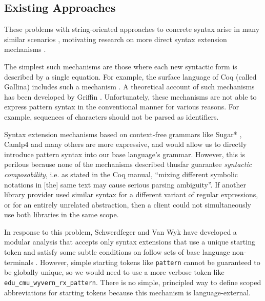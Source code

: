 \subsection{Existing Approaches}\label{sec:syntax-existing} These problems with string-oriented approaches to concrete syntax arise in many similar scenarios \cite{TSLs}, motivating  research on more direct syntax extension mechanisms \cite{Bravenboer:2007:PIA:1289971.1289975}.

The simplest such mechanisms are those where each new syntactic form is described by a single equation. For example, the surface language of Coq (called Gallina) includes such a mechanism \cite{Coq:manual}. A theoretical account of such mechanisms has been developed by Griffin \cite{5134}. Unfortunately, these mechanisms are not able to express pattern syntax in the conventional manner for various reasons. For example, sequences of characters should not be parsed as identifiers.


Syntax extension mechanisms based on context-free grammars like  Sugar* \cite{erdweg2013framework}, Camlp4 \cite{ocaml-manual} and many others are more expressive, and would allow us to directly introduce pattern syntax into our base language's grammar. However, this is perilous because none of the mechanisms described thusfar guarantee \emph{syntactic composability}, i.e. as stated in the Coq manual, ``mixing different symbolic notations in [the] same text may cause serious parsing ambiguity''. If another library provider used similar syntax for a different variant of regular expressions, or for an entirely unrelated abstraction, then a client could not simultaneously use both libraries in the same scope. %

In response to this problem, Schwerdfeger and Van Wyk have developed a modular analysis that accepts only syntax extensions that use a unique starting token and satisfy some subtle conditions on follow sets of base language non-terminals \cite{conf/pldi/SchwerdfegerW09}. However, simple starting tokens like \lstinline{pattern} cannot be guaranteed to be globally unique, so we would need to use a more verbose token like \lstinline{edu_cmu_wyvern_rx_pattern}. There is no simple, principled way to define scoped abbreviations for starting tokens because this mechanism is language-external.

